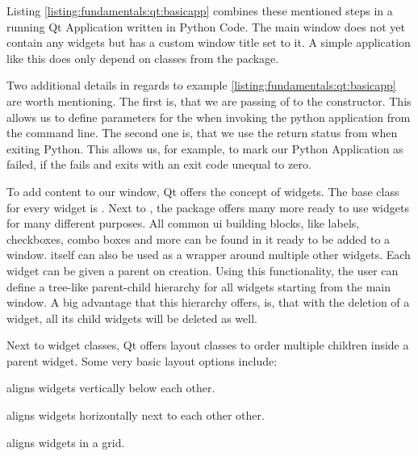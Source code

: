 Listing \ref{listing:fundamentals:qt:basicapp} combines these mentioned steps in
a running Qt Application written in Python Code. The main window does not yet
contain any widgets but has a custom window title set to it. A simple
application like this does only depend on classes from the
 package.



Two additional details in regards to example
\ref{listing:fundamentals:qt:basicapp} are worth mentioning. The first is, that
we are passing of  to the
 constructor. This allows us to define
parameters for the  when invoking the python
application from the command line. The second one is, that we use the return status
from  when exiting Python. This allows us, for
example, to mark our Python Application as failed, if the
 fails and exits with an exit code unequal to
zero.

To add content to our window, Qt offers the concept of widgets. The base class
for every widget is . Next to
, the package  offers
many more ready to use widgets for many different purposes. All common \gls{ui}
building blocks, like labels, checkboxes, combo boxes and more can be found in
it ready to be added to a window.  itself can
also be used as a wrapper around multiple other widgets. Each widget can be
given a parent on creation. Using this functionality, the user can define a
tree-like parent-child hierarchy for all widgets starting from the main window. A big
advantage that this hierarchy offers, is, that with the deletion of a widget, all
its child widgets will be deleted as well.

Next to widget classes, Qt offers layout classes to order multiple children
inside a parent widget. Some very basic layout options include:

\begin{description}

    \item {} aligns widgets vertically
        below each other.
    
    \item {} aligns widgets horizontally
        next to each other other.
    
    \item {} aligns widgets in a grid.

\end{description}

